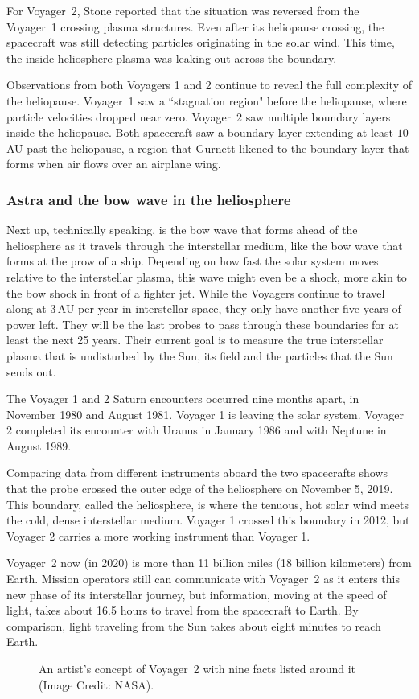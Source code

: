 \documentclass[a4paper,openany,12pt]{book}
\begin{document}
For Voyager~2, Stone reported that the situation was reversed from the Voyager~1 crossing plasma structures. Even after its heliopause crossing, the spacecraft  was still detecting particles originating in the solar wind. This time, the inside heliosphere plasma was leaking out across the boundary.

Observations from both Voyagers 1 and 2 continue to reveal the full complexity of the heliopause. Voyager~1 saw a ``stagnation region" before the heliopause, where particle velocities dropped near zero. Voyager~2 saw multiple boundary layers inside the heliopause. Both spacecraft saw a boundary layer extending at least $10\,$AU past the heliopause, a region that Gurnett likened to the boundary layer that forms when air flows over an airplane wing.

\subsubsection{Astra and the bow wave in the heliosphere}

Next up, technically speaking, is the bow wave that forms ahead of the heliosphere as it travels through the interstellar medium, like the bow wave that forms at the prow of a ship. Depending on how fast the solar system moves relative to the interstellar plasma, this wave might even be a shock, more akin to the bow shock in front of a fighter jet. While the Voyagers continue to travel along at $3\,$AU per year in interstellar space, they only have another five years of power left. They will be the last probes to pass through these boundaries for at least the next 25 years. 
Their current goal is to measure the true interstellar plasma that is undisturbed by the Sun, its field and the particles that the Sun sends out.

The Voyager 1 and 2 Saturn encounters occurred nine months apart, in November 1980 and
August 1981. Voyager 1 is leaving the solar system. Voyager 2 completed its encounter with
Uranus in January 1986 and with Neptune in August 1989.

Comparing data from different instruments aboard the two spacecrafts shows that
the probe crossed the outer edge of the heliosphere on November 5, 2019. This boundary, called the
heliosphere, is where the tenuous, hot solar wind meets the cold, dense interstellar medium. Voyager 1 crossed this boundary in 2012, but Voyager 2 carries a more working instrument than Voyager 1.

Voyager~2 now (in 2020) is more than 11 billion miles (18 billion kilometers) from Earth. Mission operators still can communicate with Voyager~2 as it enters this new phase of its interstellar journey, but information, moving at the speed of light, takes about 16.5 hours to travel from the spacecraft to Earth. By comparison, light traveling from the Sun takes about eight minutes to reach Earth. 
%
\begin{figure}[H]
\centerline{}
\caption{An artist's concept of Voyager~2 with nine facts listed around it (Image Credit: NASA).}
\label{V-numbers}
\end{figure}
%
\end{document}
